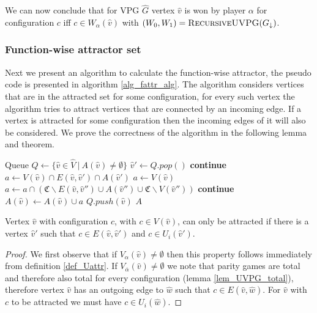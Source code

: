 We can now conclude that for VPG $\hat{G}$ vertex $\hat{v}$ is won by player $\alpha$ for configuration $c$ iff $c \in W_\alpha(\hat{v})$ with $(W_0,W_1) = \textsc{RecursiveUVPG}(G_{\downarrow})$.

\subsubsection{Function-wise attractor set}
Next we present an algorithm to calculate the function-wise attractor, the pseudo code is presented in algorithm \ref{alg_fattr_alg}. The algorithm considers vertices that are in the attracted set for some configuration, for every such vertex the algorithm tries to attract vertices that are connected by an incoming edge. If a vertex is attracted for some configuration then the incoming edges of it will also be considered. We prove the correctness of the algorithm in the following lemma and theorem.
\begin{algorithm}
	\caption{$\textsc{$\alpha$-FAttractor}(G, A : \hat{V} \rightarrow 2^\mathfrak{C})$}\label{alg_fattr_alg}
	\begin{algorithmic}[1]
		\State Queue $Q \gets \{\hat{v} \in \hat{V} \ |\ A(\hat{v}) \neq \emptyset  \}$
		\State $\hat{v}' \gets Q.pop()$
			 \State \textbf{continue} \EndIf
				\State $a \gets V(\hat{v}) \cap E(\hat{v},\hat{v}') \cap A(\hat{v}')$
			\Else
				\State $a \gets V(\hat{v})$
					\State $a \gets a \cap (\mathfrak{C}\backslash E(\hat{v},\hat{v}'') \cup A(\hat{v}'') \cup \mathfrak{C} \backslash V(\hat{v}''))$
				\EndFor
			\EndIf
			 \State \textbf{continue} \EndIf
			\State $A(\hat{v}) \gets A(\hat{v}) \cup a$
			\State $Q.push(\hat{v})$
		\EndFor
		\EndWhile
		\State \Return $A$
	\end{algorithmic}
\end{algorithm}
\begin{lemma}
\label{lem_attr_requires_E}
Vertex $\hat{v}$ with configuration $c$, with $c \in V(\hat{v})$, can only be attracted if there is a vertex $\hat{v}'$ such that $c \in E(\hat{v}, \hat{v}')$ and $c \in U_i(\hat{v}')$.
\begin{proof}
	We first observe that if $V_\alpha(\hat{v}) \neq \emptyset$ then this property follows immediately from definition \ref{def_Uattr}. If $V_{\overline{\alpha}}(\hat{v}) \neq \emptyset$ we note that parity games are total and therefore also total for every configuration (lemma \ref{lem_UVPG_total}), therefore vertex $\hat{v}$ has an outgoing edge to $\hat{w}$ such that $c \in E(\hat{v},\hat{w})$. For $\hat{v}$ with $c$ to be attracted we must have $c \in U_i(\hat{w})$.
\end{proof}
\end{lemma}
